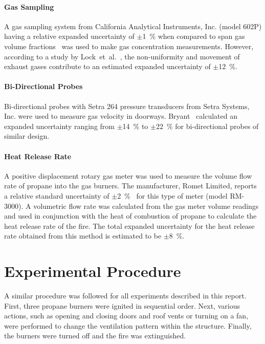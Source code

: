\documentclass[12pt,oneside]{book}
\begin{document}
\subsubsection{Gas Sampling}
A gas sampling system from California Analytical Instruments, Inc. (model 602P) having a relative expanded uncertainty of $\pm$1~\% when compared to span gas volume fractions~\cite{Bundy:2007} was used to make gas concentration measurements. However, according to a study by Lock~et~al.~\cite{Lock:1}, the non-uniformity and movement of exhaust gases contribute to an estimated expanded uncertainty of $\pm$12~\%.

\subsubsection{Bi-Directional Probes}
Bi-directional probes with Setra 264 pressure transducers from Setra Systems, Inc. were used to measure gas velocity in doorways. Bryant~\cite{Bryant:FSJ2009} calculated an expanded uncertainty ranging from $\pm$14~\% to $\pm$22~\% for bi-directional probes of similar design.

\subsubsection{Heat Release Rate}
A positive displacement rotary gas meter was used to measure the volume flow rate of propane into the gas burners. The manufacturer, Romet Limited, reports a relative standard uncertainty of $\pm$2~\%~\cite{Romet:2014} for this type of meter (model RM-3000). A volumetric flow rate was calculated from the gas meter volume readings and used in conjunction with the heat of combustion of propane to calculate the heat release rate of the fire. The total expanded uncertainty for the heat release rate obtained from this method is estimated to be $\pm8$~\%.


\chapter{Experimental Procedure}
\label{chap:Experimental_Procedure}
A similar procedure was followed for all experiments described in this report. First, three propane burners were ignited in sequential order. Next, various actions, such as opening and closing doors and roof vents or turning on a fan, were performed to change the ventilation pattern within the structure. Finally, the burners were turned off and the fire was extinguished.
\end{document}
